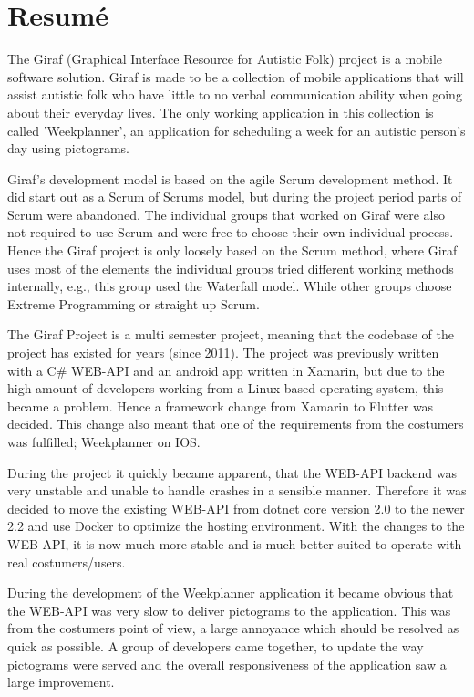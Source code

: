 \chapter*{Resumé}
The Giraf (Graphical Interface Resource for Autistic Folk) project is a mobile software solution.
Giraf is made to be a collection of mobile applications that will assist autistic folk who have little to no verbal communication ability when going about their everyday lives.
The only working application in this collection is called 'Weekplanner', an application for scheduling a week for an autistic person's day using pictograms.

Giraf's development model is based on the agile Scrum development method.
It did start out as a Scrum of Scrums model, but during the project period parts of Scrum were abandoned.
The individual groups that worked on Giraf were also not required to use Scrum and were free to choose their own individual process.
Hence the Giraf project is only loosely based on the Scrum method, where Giraf uses most of the elements the individual groups tried different working methods internally, e.g., this group used the Waterfall model.
While other groups choose Extreme Programming or straight up Scrum. 

The Giraf Project is a multi semester project, meaning that the codebase of the project has existed for years (since 2011). 
The project was previously written with a C\# WEB-API and an android app written in Xamarin, but due to the high amount of developers working from a Linux based operating system, this became a problem. 
Hence a framework change from Xamarin to Flutter was decided. 
This change also meant that one of the requirements from the costumers was fulfilled; Weekplanner on IOS.

During the project it quickly became apparent, that the WEB-API backend was very unstable and unable to handle crashes in a sensible manner. 
Therefore it was decided to move the existing WEB-API from dotnet core version 2.0 to the newer 2.2 and use Docker to optimize the hosting environment. 
With the changes to the WEB-API, it is now much more stable and is much better suited to operate with real costumers/users.

During the development of the Weekplanner application it became obvious that the WEB-API was very slow to deliver pictograms to the application. 
This was from the costumers point of view, a large annoyance which should be resolved as quick as possible. 
A group of developers came together, to update the way pictograms were served and the overall responsiveness of the application saw a large improvement.

